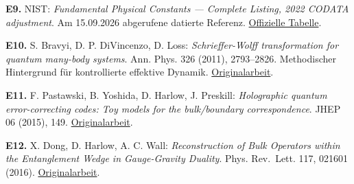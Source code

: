 \textbf{E9.} NIST: \emph{Fundamental Physical Constants --- Complete
Listing, 2022 CODATA adjustment}. Am 15.09.2026 abgerufene datierte
Referenz.
\href{https://physics.nist.gov/cuu/Constants/Table/allascii.txt}{Offizielle
Tabelle}.

\textbf{E10.} S. Bravyi, D. P. DiVincenzo, D. Loss:
\emph{Schrieffer-Wolff transformation for quantum many-body systems}.
Ann. Phys. 326 (2011), 2793--2826. Methodischer Hintergrund für
kontrollierte effektive Dynamik.
\href{https://arxiv.org/abs/1105.0675}{Originalarbeit}.

\textbf{E11.} F. Pastawski, B. Yoshida, D. Harlow, J. Preskill:
\emph{Holographic quantum error-correcting codes: Toy models for the
bulk/boundary correspondence}. JHEP 06 (2015), 149.
\href{https://arxiv.org/abs/1503.06237}{Originalarbeit}.

\textbf{E12.} X. Dong, D. Harlow, A. C. Wall: \emph{Reconstruction of
Bulk Operators within the Entanglement Wedge in Gauge-Gravity Duality}.
Phys. Rev.~Lett. 117, 021601 (2016).
\href{https://arxiv.org/abs/1601.05416}{Originalarbeit}.


